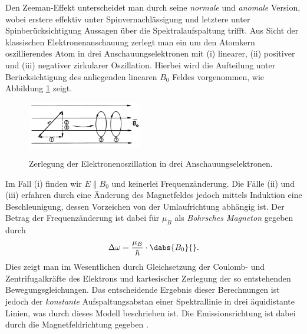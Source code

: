 Den Zeeman-Effekt unterscheidet man durch seine \emph{normale} und \emph{anomale} Version, wobei erstere effektiv unter Spinvernachlässigung und letztere unter Spinberücksichtigung Aussagen über die Spektralaufspaltung trifft. Aus Sicht der klassischen Elektronenanschauung zerlegt man ein um den Atomkern oszillierendes Atom in drei Anschauungselektronen mit (i) linearer, (ii) positiver und (iii) negativer zirkularer Oszillation. Hierbei wird die Aufteilung unter Berücksichtigung des anliegenden linearen $B_0$ Feldes vorgenommen, wie Abbildung \ref{fig:ElektronenOszillationZerlegung} zeigt. 
\begin{figure}[H]
	\centering
	\includegraphics[width=5cm]{Bilddateien/Grundlagen/ElektronOszillationZerlegung.png}
	\label{fig:ElektronenOszillationZerlegung}
	\caption{Zerlegung der Elektronenoszillation in drei Anschauungselektronen.}
\end{figure}
Im Fall (i) finden wir $E\parallel B_0$ und keinerlei Frequenzänderung. Die Fälle (ii) und (iii) erfahren durch eine Änderung des Magnetfeldes jedoch mittels Induktion eine Beschleunigung, dessen Vorzeichen von der Umlaufrichtung abhängig ist. Der Betrag der Frequenzänderung ist dabei für $\mu_B$ als \emph{Bohrsches Magneton} gegeben durch 
\[
	\Delta\omega = \frac{\mu_B}{\hbar}\cdot\dabs{B_0}{}.
\]
Dies zeigt man im Wesentlichen durch Gleichsetzung der Coulomb- und Zentrifugalkräfte des Elektrons und kartesischer Zerlegung der so entstehenden Bewegungsgleichungen. Das entscheidende Ergebnis dieser Berechnungen ist jedoch der \emph{konstante} Aufspaltungsabstan einer Spektrallinie in drei äquidistante Linien, was durch dieses Modell beschrieben ist. Die Emissionsrichtung ist dabei durch die Magnetfeldrichtung gegeben \cite[p.216ff]{HakenWolf}.

